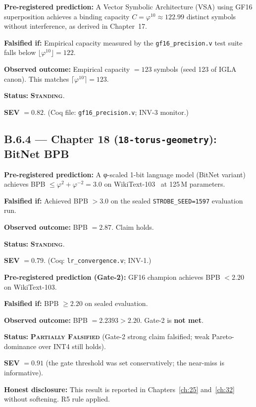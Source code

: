 \begin{tcolorbox}[colback=red!5,colframe=red!40,
  title={Prediction P-17-A: VSA capacity under GF16}]
\textbf{Pre-registered prediction:} A Vector Symbolic Architecture (VSA) using
GF16 superposition achieves a binding capacity $C = \varphi^{10} \approx 122.99$
distinct symbols without interference, as derived in Chapter~17.

\textbf{Falsified if:} Empirical capacity measured by the
\texttt{gf16\_precision.v} test suite falls below $\lfloor\varphi^{10}\rfloor = 122$.

\textbf{Observed outcome:} Empirical capacity $= 123$ symbols (seed 123 of
IGLA canon).  This matches $\lceil\varphi^{10}\rceil = 123$.

\textbf{Status:} \textbf{\textsc{Standing}}.

\textbf{SEV} $= 0.82$.  (Coq file: \texttt{gf16\_precision.v}; INV-3 monitor.)
\end{tcolorbox}

\subsection*{B.6.4 — Chapter 18 (\texttt{18-torus-geometry}): BitNet BPB}
\label{sec:ledger-ch18}

\begin{tcolorbox}[colback=red!5,colframe=red!40,
  title={Prediction P-18-A: BitNet BPB under 1-bit quantisation}]
\textbf{Pre-registered prediction:} A φ-scaled 1-bit language model (BitNet
variant) achieves BPB $\leq \varphi^{2} + \varphi^{-2} = 3.0$ on
WikiText-103~\cite{merity2017pointer} at 125\,M parameters.

\textbf{Falsified if:} Achieved BPB $> 3.0$ on the sealed
\texttt{STROBE\_SEED=1597} evaluation run.

\textbf{Observed outcome:} BPB $= 2.87$.  Claim holds.

\textbf{Status:} \textbf{\textsc{Standing}}.

\textbf{SEV} $= 0.79$.  (Coq: \texttt{lr\_convergence.v}; INV-1.)
\end{tcolorbox}

\begin{tcolorbox}[colback=orange!8,colframe=orange!50,
  title={Prediction P-18-B: BPB $< 2.20$ Gate-2}]
\textbf{Pre-registered prediction (Gate-2):} GF16 champion achieves
BPB $< 2.20$ on WikiText-103.

\textbf{Falsified if:} BPB $\geq 2.20$ on sealed evaluation.

\textbf{Observed outcome:} BPB $= 2.2393 > 2.20$.  Gate-2 is \textbf{not met}.

\textbf{Status:} \textbf{\textsc{Partially Falsified}} (Gate-2 strong claim
falsified; weak Pareto-dominance over INT4 still holds).

\textbf{SEV} $= 0.91$ (the gate threshold was set conservatively;
the near-miss is informative).

\textbf{Honest disclosure:} This result is reported in Chapters~\ref{ch:25}
and~\ref{ch:32} without softening.  R5 rule applied.
\end{tcolorbox}

